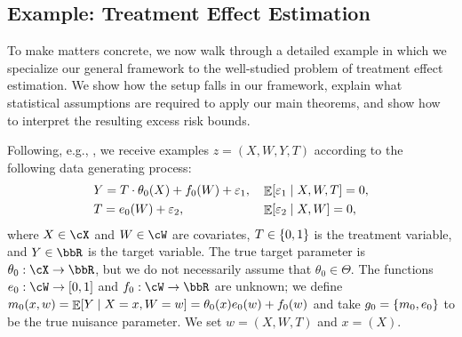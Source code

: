 \documentclass[11pt]{article} %
\theoremstyle{theorem}  %
\theoremstyle{plain}
\DeclarePairedDelimiter{\brk}{[}{]}
\DeclarePairedDelimiter{\crl}{\{}{\}}
\DeclareMathOperator{\En}{\mathbb{E}}
\newcommand{\veps}{\varepsilon}
\newcommand{\varone}{w} %
\newcommand{\vartwo}{x} %
\newcommand{\target}{\Theta}
\newcommand{\gttwo}{\theta_0}
\newcommand{\param}{parameter\xspace}
\begin{document}
%
%
%
%
 
\subsection{Example: Treatment Effect Estimation}
\label{sec:treatment_effect}
%
%

\newcommand{\lambdap}{\lambda_{p}}
\newcommand{\lambdare}{\lambda_{\mathsf{re}}}

%

To make matters concrete, we now walk through a detailed example in which we specialize our general framework to the well-studied problem of treatment effect estimation. We show how the setup falls in our framework, explain what statistical assumptions are required to apply our main theorems, and show how to interpret the resulting excess risk bounds.

Following, e.g., \cite{robinson1988root,nie2017quasi}, we receive examples $z=(X,W,Y,T)$ according to the following data generating process:
\begin{equation}
\label{eqn:treatment_control_dgp}
\begin{aligned}
&Y = T\cdot{}\theta_0(X) + f_0(W) + \veps_1,&&\En\brk*{\veps_1\mid{}X,W,T}=0,\\
&T=e_0(W) + \veps_2,&&\En\brk*{\veps_2\mid{}X,W}=0,
\end{aligned}
\end{equation}
where $X\in\cX$ and $W\in\cW$ are covariates, $T\in\crl*{0,1}$ is the treatment variable, and $Y\in\bbR$ is the target variable. The true target \param is $\theta_0:\cX\to\bbR$, but we do not necessarily assume that $\gttwo\in\target$. The functions $e_0:\cW\to\brk*{0,1}$ and $f_{0}:\cW\to\bbR$ are unknown; we define $m_0(x,w)=\En\brk*{Y\mid{}X=x,W=w}=\theta_0(x)e_0(w) + f_0(w)$ and take $g_0=\crl*{m_0,e_0}$ to be the true nuisance parameter. We set $\varone=(X,W,T)$ and $\vartwo=(X)$.
\end{document}
